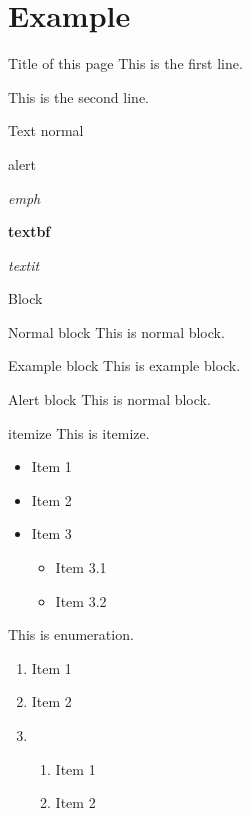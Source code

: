 
\section{Example}
\begin{frame}{Title of this page}
  This is the first line.\par
    \pause%
  This is the second line.
\end{frame}

\begin{frame}{Text}
  normal\par
  \alert{alert}\par
  \emph{emph}\par
  \textbf{textbf}\par
  \textit{textit}\par
\end{frame}

\begin{frame}{Block}
  \begin{block}{Normal block}
    This is normal block.
  \end{block}
  \begin{exampleblock}{Example block}
    This is example block.
  \end{exampleblock}
  \begin{alertblock}{Alert block}
    This is normal block.
  \end{alertblock}
\end{frame}

\begin{frame}{itemize}
    This is itemize.
    \begin{itemize}
      \item Item 1
      \item Item 2
      \item Item 3
            \begin{itemize}
              \item Item 3.1
              \item Item 3.2
            \end{itemize}
    \end{itemize}

    This is enumeration.
    \begin{enumerate}
      \item Item 1
      \item Item 2
      \item \begin{enumerate}
        \item Item 1
        \item Item 2
      \end{enumerate}
    \end{enumerate}
\end{frame}

